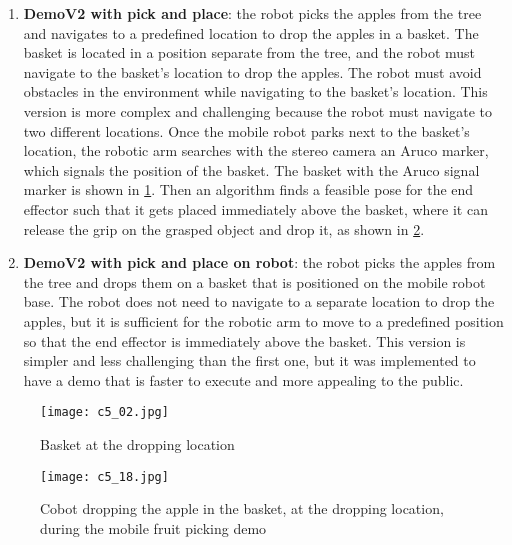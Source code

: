 \begin{enumerate}
    \item \textbf{DemoV2 with pick and place}: the robot picks the apples from the tree and navigates to a predefined
    location to drop the apples in a basket. The basket is located in a position separate from the tree, and the robot
    must navigate to the basket's location to drop the apples. The robot must avoid obstacles in the environment
    while navigating to the basket's location. This version is more complex and challenging because the robot must
    navigate to two different locations. Once the mobile robot parks next to the basket's location, the robotic
    arm searches with the stereo camera an Aruco marker, which signals the position of the basket. 
    The basket with the Aruco signal marker is shown in \ref{fig:basket}. Then
    an algorithm finds a feasible pose for the end effector such that it gets placed immediately above the basket,
    where it can release the grip on the grasped object and drop it, as shown in \ref{fig:mfp3}.
    \item \textbf{DemoV2 with pick and place on robot}: the robot picks the apples from the tree and drops them on
    a basket that is positioned on the mobile robot base. The robot does not need to navigate to a separate location
    to drop the apples, but it is sufficient for the robotic arm to move to a predefined position so that
    the end effector is immediately above the basket. This version is simpler and less challenging than the first one,
    but it was implemented to have a demo that is faster to execute and more appealing to the public.
\end{enumerate}

\begin{figure}[t]
    \centering
    \texttt{[image: c5\_02.jpg]}
    \caption{Basket at the dropping location}
    \label{fig:basket}
\end{figure}

\begin{figure}[t]
    \centering
    \texttt{[image: c5\_18.jpg]}
    \caption{Cobot dropping the apple in the basket, at the dropping location, during the mobile fruit picking demo}
    \label{fig:mfp3}
\end{figure}

